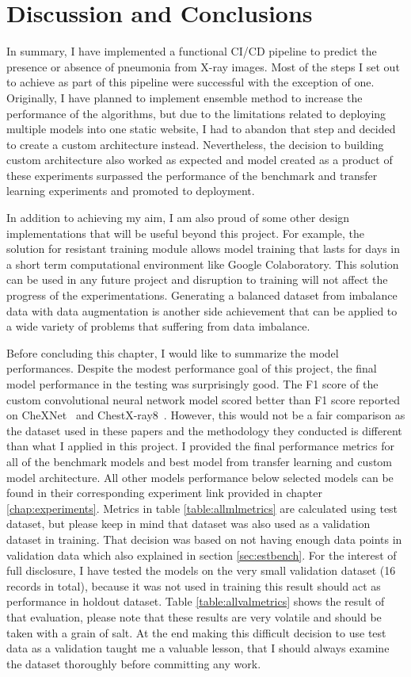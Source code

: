 \chapter{Discussion and Conclusions}
In summary, I have implemented a functional CI/CD pipeline to predict the presence or absence of pneumonia from X-ray images.
Most of the steps I set out to achieve as part of this pipeline were successful with the exception of one. 
Originally, I have planned to implement ensemble method to increase the performance of the algorithms, but due to the limitations related to deploying multiple models into one static website, I had to abandon that step and decided to create a custom architecture instead.
Nevertheless, the decision to building custom architecture also worked as expected and model created as a product of these experiments surpassed the performance of the benchmark and transfer learning experiments and promoted to deployment.

In addition to achieving my aim, I am also proud of some other design implementations that will be useful beyond this project.
For example, the solution for resistant training module allows model training that lasts for days in a short term computational environment like Google Colaboratory.
This solution can be used in any future project and disruption to training will not affect the progress of the experimentations.
Generating a balanced dataset from imbalance data with data augmentation is another side achievement that can be applied to a wide variety of problems that suffering from data imbalance.

Before concluding this chapter, I would like to summarize the model performances.
Despite the modest performance goal of this project, the final model performance in the testing was surprisingly good.
The F1 score of the custom convolutional neural network model scored better than F1 score reported on CheXNet~\cite{CheXNetRP} and ChestX-ray8~\cite{ChestX-ray8}.
However, this would not be a fair comparison as the dataset used in these papers and the methodology they conducted is different than what I applied in this project.
I provided the final performance metrics for all of the benchmark models and best model from transfer learning and custom model architecture.
All other models performance below selected models can be found in their corresponding experiment link provided in chapter \ref{chap:experiments}.
Metrics in table \ref{table:allmlmetrics} are calculated using test dataset, but please keep in mind that dataset was also used as a validation dataset in training. 
That decision was based on not having enough data points in validation data which also explained in section \ref{sec:estbench}.
For the interest of full disclosure, I have tested the models on the very small validation dataset (16 records in total), because it was not used in training this result should act as performance in holdout dataset. 
Table \ref{table:allvalmetrics} shows the result of that evaluation, please note that these results are very volatile and should be taken with a grain of salt.
At the end making this difficult decision to use test data as a validation taught me a valuable lesson, that I should always
examine the dataset thoroughly before committing any work.



